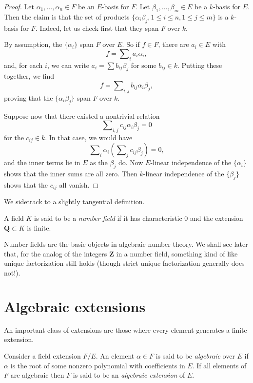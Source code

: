 \begin{proof}
Let $\alpha_1, \dots, \alpha_n \in F$ be an $E$-basis for $F$. Let
$\beta_1, \dots, \beta_m \in E$ be a $k$-basis for $E$. Then the claim is
that the set of products
$\{\alpha_i \beta_j, 1 \leq i \leq n, 1 \leq j \leq m\}$
is a $k$-basis for $F$. Indeed, let us check first that they span $F$ over $k$.

\medskip\noindent
By assumption, the $\{\alpha_i\}$ span $F$ over $E$. So if
$f \in F$, there are $a_i \in E$ with
$$
f = \sum\nolimits_i a_i \alpha_i,
$$
and, for each $i$, we can write $a_i = \sum b_{ij} \beta_j$ for some
$b_{ij} \in k$. Putting these together, we find
$$
f = \sum\nolimits_{i,j} b_{ij} \alpha_i \beta_j,
$$
proving that the $\{\alpha_i \beta_j\}$ span $F$ over $k$.

\medskip\noindent
Suppose now that there existed a nontrivial relation
$$
\sum\nolimits_{i,j} c_{ij} \alpha_i \beta_j = 0
$$
for the $c_{ij} \in k$. In that case, we would have
$$
\sum\nolimits_i \alpha_i \left( \sum\nolimits_j c_{ij} \beta_j \right) = 0,
$$
and the inner terms lie in $E$ as the $\beta_j$ do. Now $E$-linear
independence of the $\{\alpha_i\}$ shows that the inner sums are all zero.
Then $k$-linear independence of the $\{\beta_j\}$ shows that the
$c_{ij}$ all vanish.
\end{proof}

\noindent
We sidetrack to a slightly tangential definition.

\begin{definition}
\label{definition-number-field}
A field $K$ is said to be a {\it number field} if it has characteristic
$0$ and the extension $\mathbf{Q} \subset K$ is finite.
\end{definition}

\noindent
Number fields are the basic objects in algebraic number theory. We shall see
later that,
for the analog of the integers $\mathbf{Z}$ in a number field, something kind
of like unique factorization still holds (though strict unique factorization
generally does not!).


\section{Algebraic extensions}
\label{section-algebraic-extensions}

\noindent
An important class of extensions are those where every element generates
a finite extension.

\begin{definition}
\label{definition-algebraic}
Consider a field extension $F/E$. An element $\alpha \in F$ is said to be
{\it algebraic} over $E$ if $\alpha$ is the root of some nonzero polynomial
with coefficients in $E$. If all elements of $F$ are algebraic then $F$ is
said to be an {\it algebraic extension} of $E$.
\end{definition}

